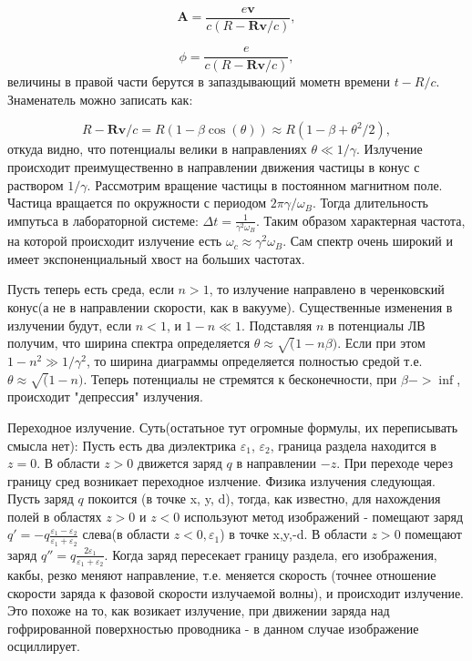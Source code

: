 \documentclass[10pt, a4paper]{article}
\begin{document}
\begin{equation}
    \mathbf{A}=\frac{e\mathbf{v}}{c(R-\mathbf{R}\mathbf{v}/c)},
\end{equation}

\begin{equation}
    \phi=\frac{e}{c(R-\mathbf{R}\mathbf{v}/c)},
\end{equation}
величины в правой части берутся в запаздывающий мометн времени $t-R/c$. Знаменатель можно записать как:

\begin{equation}
    R - \mathbf{R}\mathbf{v}/c=R(1-\beta\cos(\theta))\approx R(1-\beta+\theta^2/2),
\end{equation}
откуда видно, что потенциалы велики в направлениях $\theta \ll 1/\gamma$. Излучение происходит преимущественно в
направлении движения частицы в конус с раствором $1/\gamma$. Рассмотрим вращение частицы в постоянном магнитном поле. 
Частица вращается по окружности с периодом $2\pi\gamma/\omega_B$. Тогда длительность импутьса в лабораторной системе:
$\Delta t = \frac{1}{\gamma^2\omega_B}$. Таким образом характерная частота, на которой происходит излучение есть 
$\omega_c \approx \gamma^2\omega_B$. Сам спектр очень широкий и имеет экспоненциальный хвост на больших частотах.

Пусть теперь есть среда, если $n>1$, то излучение направлено в черенковский конус(а не в направлении скорости, как в 
вакууме).
Существенные изменения в излучении будут, если $n<1$, и $1-n\ll1$. Подставляя $n$ в потенциалы ЛВ получим, что
ширина спектра определяется $\theta \approx \sqrt(1-n\beta)$. Если при этом $1-n^2\gg1/\gamma^2$, то ширина диаграммы
определяется полностью средой т.е. $\theta\approx\sqrt(1-n)$. Теперь потенциалы не стремятся к бесконечности, при
$\beta ->\inf$, происходит "депрессия" излучения.

Переходное излучение.
Суть(остатьное тут огромные формулы, их переписывать смысла нет): Пусть есть два диэлектрика $\varepsilon_1$,
$\varepsilon_2$, граница раздела находится в $z=0$. В области $z>0$ движется заряд $q$ в направлении $-z$. При переходе
через границу сред возникает переходное излчение.
Физика излучения следующая. Пусть заряд $q$ покоится (в точке x, y, d), тогда, как известно, для нахождения
полей в областях $z>0$ и $z<0$ используют метод изображений - помещают заряд
$q'=-q\frac{\varepsilon_1-\varepsilon_2}{\varepsilon_1+\varepsilon_2}$ 
слева(в области $z<0, \varepsilon_1$) в точке x,y,-d. В области $z>0$ помещают 
заряд $q''=q\frac{2\varepsilon_1}{\varepsilon_1+\varepsilon_2}$.
Когда заряд пересекает границу раздела, его изображения, какбы, резко меняют направление, т.е. меняется скорость
(точнее отношение скорости заряда к фазовой скорости излучаемой волны), и происходит излучение. Это похоже на то,
как возикает излучение, при движении заряда над гофрированной поверхностью проводника - в данном случае изображение 
осциллирует.
\end{document}

